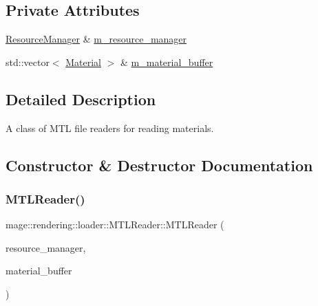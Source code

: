 \subsection*{Private Attributes}
\begin{DoxyCompactItemize}
\item 
\mbox{\hyperlink{classmage_1_1rendering_1_1_resource_manager}{Resource\+Manager}} \& \mbox{\hyperlink{classmage_1_1rendering_1_1loader_1_1_m_t_l_reader_aa227ae7e44df08b1973171ff165eadb8}{m\+\_\+resource\+\_\+manager}}
\item 
std\+::vector$<$ \mbox{\hyperlink{classmage_1_1rendering_1_1_material}{Material}} $>$ \& \mbox{\hyperlink{classmage_1_1rendering_1_1loader_1_1_m_t_l_reader_ae2fef19220c95fa5593fb43ea86c7293}{m\+\_\+material\+\_\+buffer}}
\end{DoxyCompactItemize}


\subsection{Detailed Description}
A class of M\+TL file readers for reading materials. 

\subsection{Constructor \& Destructor Documentation}
\mbox{\label{classmage_1_1rendering_1_1loader_1_1_m_t_l_reader_a3615f6899de22b53de1bad257ac34099}} 
\subsubsection{\texorpdfstring{M\+T\+L\+Reader()}{MTLReader()}\hspace{0.1cm}{\footnotesize\ttfamily [1/3]}}
{\footnotesize\ttfamily mage\+::rendering\+::loader\+::\+M\+T\+L\+Reader\+::\+M\+T\+L\+Reader (\begin{DoxyParamCaption}\item[{\mbox{\hyperlink{classmage_1_1rendering_1_1_resource_manager}{Resource\+Manager}} \&}]{resource\+\_\+manager,  }\item[{std\+::vector$<$ \mbox{\hyperlink{classmage_1_1rendering_1_1_material}{Material}} $>$ \&}]{material\+\_\+buffer }\end{DoxyParamCaption})\hspace{0.3cm}{\ttfamily [explicit]}}

